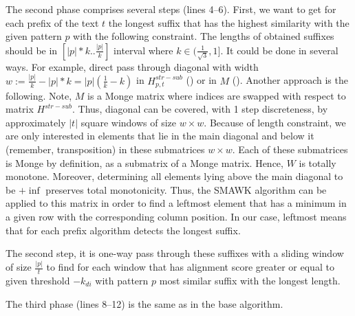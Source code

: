 The second phase comprises several steps (lines 4--6).
First, we want to get for each prefix of the text $t$ the longest suffix that has the highest similarity with the given pattern $p$ with the following constraint.
The lengths of obtained suffixes should be in $[|p|*k..\frac{|p|}{k}]$ interval where $k \in (\frac{1}{\sqrt{3}},1]$.
It could be done in several ways.
For example, direct pass through diagonal with width $w:= \frac{|p|}{k} - |p|*k = |p|(\frac{1}{k} - k)$ in $H^{str-sub}_{p,t}$ () or in $M$ ().
Another approach is the following.
Note, $M$ is a Monge matrix where indices are swapped with respect to matrix $H^{str-sub}$.
Thus, diagonal can be covered, with 1 step discreteness, by approximately $ | t | $ square windows of size $ w \times w $.
Because of length constraint, we are only interested in elements that lie in the main diagonal and below it (remember, transposition) in these submatrices $w\times w$.
Each of these submatrices is Monge by definition, as a submatrix of a Monge matrix.
Hence, $W$ is totally monotone.
Moreover, determining all elements lying above the main diagonal to be $+\inf$ preserves total monotonicity.
Thus, the \textrm{SMAWK} algorithm\cite{.} can be applied to this matrix in order to find a leftmost element that has a minimum in a given row with the corresponding column position.
In our case, leftmost means that for each prefix algorithm detects the longest suffix.

The second step, it is one-way pass through these suffixes with a sliding window of size $\frac{|p|}{t}$ to find for each window that has alignment score greater or equal to given threshold $-k_{di}$ with pattern $p$ most similar suffix with the longest length. 

The third phase (lines 8--12) is the same as in the base algorithm.

